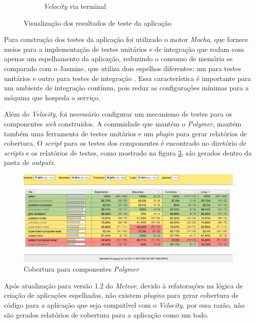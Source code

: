 \begin{figure}[h!]
\begin{subfigure}{.45\textwidth}
  		\caption{\textit{Velocity} via terminal}
  		\label{fig:teste_b}
	\end{subfigure}
	\caption{Visualização dos resultados de teste da aplicação}
	\label{fig:testes}
\end{figure}

Para construção dos testes da aplicação foi utilizado o motor \textit{Mocha}, que fornece meios para a implementação de testes unitários e de integração que rodam com apenas um espelhamento da aplicação, reduzindo o consumo de memória se comparado com o Jasmine, que utiliza dois espelhos diferentes: um para testes unitários e outro para testes de integração \cite{jasmine2015}. Essa característica é importante para um ambiente de integração contínua, pois reduz as configurações mínimas para a máquina que hospeda o serviço.

Além do \textit{Velocity}, foi necessário configurar um mecanismo de testes para os componentes \textit{web} construídos. A comunidade que mantém o \textit{Polymer}, mantém também uma ferramenta de testes unitários e um \textit{plugin} para gerar relatórios de cobertura. O \textit{script} para os testes dos componentes é encontrado no diretório de \textit{scripts} e os relatórios de testes, como mostrado na figura \ref{fig:teste_polymer}, são gerados dentro da pasta de \textit{outputs}.

\begin{figure}[h!]
  	\centering
  	\includegraphics[width=1\linewidth]{figuras/teste_polymer.eps}
  	\caption{Cobertura para componentes \textit{Polymer}}
  	\label{fig:teste_polymer}
\end{figure}

Após atualização para versão 1.2 do \textit{Meteor}, devido à refatorações na lógica de criação de aplicações espelhadas, não existem \textit{plugins} para gerar cobertura de código para a aplicação que seja compatível com o \textit{Velocity}, por essa razão, não são gerados relatórios de cobertura para a aplicação como um todo.

